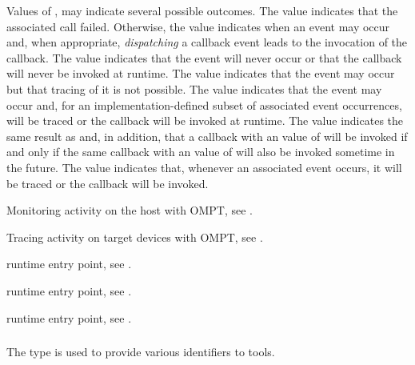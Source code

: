 \descr
Values of , may indicate several possible outcomes. 
The  value indicates that the associated call failed.
Otherwise, the value indicates when an event may occur and, when appropriate,
\emph{dispatching} a callback event leads to the invocation of the callback. 
The  value indicates that the event will never occur or 
that the callback will never be invoked at runtime. The  
value indicates that the event may occur but that tracing of it is not possible.
The  value indicates that the event may occur and, for
an implementation-defined subset of associated event occurrences, will be traced 
or the callback will be invoked at runtime. The  
value indicates the same result as  and, in addition, 
that a callback with an  value of  will be 
invoked if and only if the same callback with an  value of 
 will also be invoked sometime in the future. The 
 value indicates that, whenever an associated event occurs,
it will be traced or the callback will be invoked.

\begin{crossrefs}
\item Monitoring activity on the host with OMPT,
see .

\item Tracing activity on target devices with OMPT,
see .

\item {} runtime entry point,
see .

\item {} runtime entry point,
see .

\item {} runtime entry point,
see .
\end{crossrefs}



\subsubsection{}
\label{sec:ompt_id_t}

\summary
The  type is used to provide various identifiers to tools.

